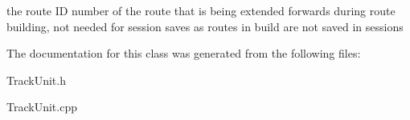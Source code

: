 the route ID number of the route that is being extended forwards during route building, not needed for session saves as routes in build are not saved in sessions 

The documentation for this class was generated from the following files\+:\begin{DoxyCompactItemize}
\item 
Track\+Unit.\+h\item 
Track\+Unit.\+cpp\end{DoxyCompactItemize}
